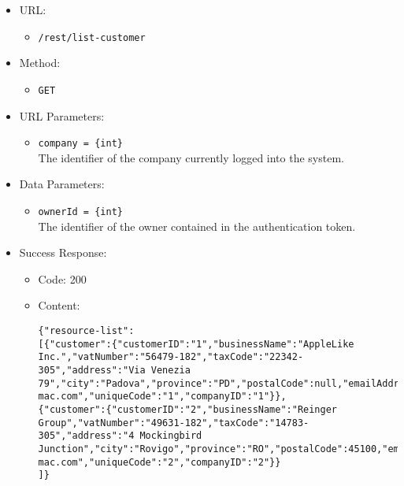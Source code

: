 \begin{itemize}

    \item URL:
    \begin{itemize}
        \item \texttt{/rest/list-customer}
    \end{itemize}

    \item Method:
    \begin{itemize}
        \item \texttt{GET}
    \end{itemize}

    \item URL Parameters:
    \begin{itemize}
        \item \texttt{company = \{int\}} \\
        The identifier of the company currently logged into the system.
    \end{itemize}

    \item Data Parameters:
    \begin{itemize}
        \item \texttt{ownerId = \{int\}} \\
        The identifier of the owner contained in the authentication token.
    \end{itemize}

    \item Success Response:
    \begin{itemize}
        \item Code: 200
        \item Content:
        \begin{lstlisting}
{"resource-list":
[{"customer":{"customerID":"1","businessName":"AppleLike Inc.","vatNumber":"56479-182","taxCode":"22342-305","address":"Via Venezia 79","city":"Padova","province":"PD","postalCode":null,"emailAddress":"applelike@google.com","pec":"applelike@pec-mac.com","uniqueCode":"1","companyID":"1"}},
{"customer":{"customerID":"2","businessName":"Reinger Group","vatNumber":"49631-182","taxCode":"14783-305","address":"4 Mockingbird Junction","city":"Rovigo","province":"RO","postalCode":45100,"emailAddress":"rfrankum1@google.nl","pec":"plyster1@pec-mac.com","uniqueCode":"2","companyID":"2"}}
]}
        \end{lstlisting}
    \end{itemize}


\end{itemize}
